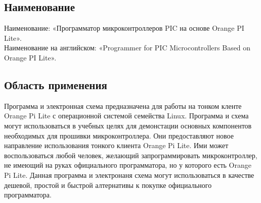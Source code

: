 \subsection{Наименование}
Наименование: «Программатор микроконтроллеров PIC на основе Orange PI Lite». \\
Наименование на английском: «Programmer for PIC Microcontrollers Based on Orange PI Lite». \\

\subsection{Область применения}
Программа и электронная схема предназначена для работы на тонком кленте Orange Pi Lite с операционной системой семейства Linux. Программа и схема могут использоваться в учебных целях для демонстации основных компонентов необходимых для прошивки микроконтроллера. Они предоставляют новое направление использования тонкого клиента Orange Pi Lite. Ими может воспользоваться любой человек, желающий запрограммировать микроконтроллер, не имеющий на руках официального программатора, но у которого есть Orange Pi Lite. Данная программа и электронаня схема могут использоваться в качестве дешевой, простой и быстрой алтернативы к покупке официального программатора.